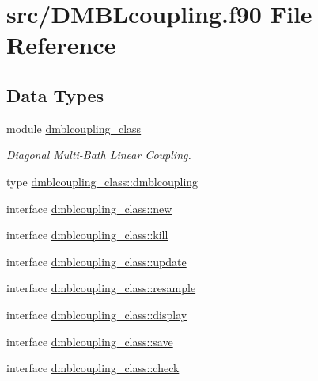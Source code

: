 \hypertarget{_d_m_b_lcoupling_8f90}{\section{src/\+D\+M\+B\+Lcoupling.f90 File Reference}
\label{_d_m_b_lcoupling_8f90}
}
\subsection*{Data Types}
\begin{DoxyCompactItemize}
\item 
module \hyperlink{classdmblcoupling__class}{dmblcoupling\+\_\+class}
\begin{DoxyCompactList}\small\item\em Diagonal Multi-\/\+Bath Linear Coupling. \end{DoxyCompactList}\item 
type \hyperlink{structdmblcoupling__class_1_1dmblcoupling}{dmblcoupling\+\_\+class\+::dmblcoupling}
\item 
interface \hyperlink{interfacedmblcoupling__class_1_1new}{dmblcoupling\+\_\+class\+::new}
\item 
interface \hyperlink{interfacedmblcoupling__class_1_1kill}{dmblcoupling\+\_\+class\+::kill}
\item 
interface \hyperlink{interfacedmblcoupling__class_1_1update}{dmblcoupling\+\_\+class\+::update}
\item 
interface \hyperlink{interfacedmblcoupling__class_1_1resample}{dmblcoupling\+\_\+class\+::resample}
\item 
interface \hyperlink{interfacedmblcoupling__class_1_1display}{dmblcoupling\+\_\+class\+::display}
\item 
interface \hyperlink{interfacedmblcoupling__class_1_1save}{dmblcoupling\+\_\+class\+::save}
\item 
interface \hyperlink{interfacedmblcoupling__class_1_1check}{dmblcoupling\+\_\+class\+::check}
\end{DoxyCompactItemize}
